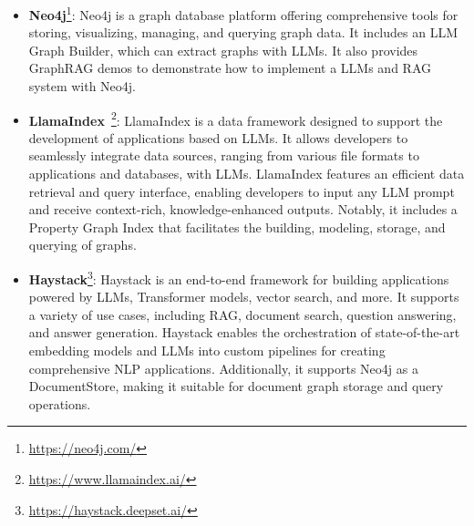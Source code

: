 \begin{itemize}[leftmargin=*]
    \item \textbf{Neo4j}\footnote{\url{https://neo4j.com/}}: Neo4j is a graph database platform offering comprehensive tools for storing, visualizing, managing, and querying graph data. It includes an LLM Graph Builder, which can extract graphs with LLMs. It also provides GraphRAG demos to demonstrate how to implement a LLMs and RAG system with Neo4j.
    \item \textbf{LlamaIndex}~\citep{Liu_LlamaIndex_2022}\footnote{\url{https://www.llamaindex.ai/}}: LlamaIndex is a data framework designed to support the development of applications based on LLMs. It allows developers to seamlessly integrate data sources, ranging from various file formats to applications and databases, with LLMs. LlamaIndex features an efficient data retrieval and query interface, enabling developers to input any LLM prompt and receive context-rich, knowledge-enhanced outputs. Notably, it includes a Property Graph Index that facilitates the building, modeling, storage, and querying of graphs.
    \item \textbf{Haystack}\footnote{\url{https://haystack.deepset.ai/}}: Haystack is an end-to-end framework for building applications powered by LLMs, Transformer models, vector search, and more. It supports a variety of use cases, including RAG, document search, question answering, and answer generation. Haystack enables the orchestration of state-of-the-art embedding models and LLMs into custom pipelines for creating comprehensive NLP applications. Additionally, it supports Neo4j as a DocumentStore, making it suitable for document graph storage and query operations.
\end{itemize}